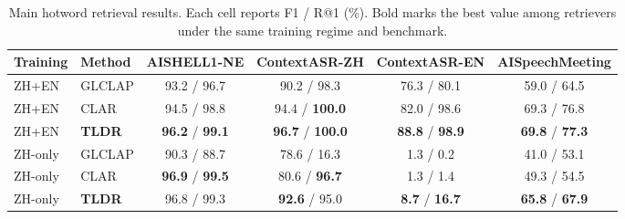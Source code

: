 \begin{table}[t]
\centering
\caption{Main hotword retrieval results. Each cell reports F1 / R@1 (\%). Bold marks the best value among retrievers under the same training regime and benchmark.}
\label{tab:retrieval_main}
\small
\begin{tabular}{llcccc}
\toprule
Training & Method & AISHELL1-NE & ContextASR-ZH & ContextASR-EN & AISpeechMeeting \\
\midrule
ZH+EN & GLCLAP & 93.2 / 96.7 & 90.2 / 98.3 & 76.3 / 80.1 & 59.0 / 64.5 \\
ZH+EN & CLAR & 94.5 / 98.8 & 94.4 / \textbf{100.0} & 82.0 / 98.6 & 69.3 / 76.8 \\
ZH+EN & \textbf{TLDR} & \textbf{96.2} / \textbf{99.1} & \textbf{96.7} / \textbf{100.0} & \textbf{88.8} / \textbf{98.9} & \textbf{69.8} / \textbf{77.3} \\
\midrule
ZH-only & GLCLAP & 90.3 / 88.7 & 78.6 / 16.3 & 1.3 / 0.2 & 41.0 / 53.1 \\
ZH-only & CLAR & \textbf{96.9} / \textbf{99.5} & 80.6 / \textbf{96.7} & 1.3 / 1.4 & 49.3 / 54.5 \\
ZH-only & \textbf{TLDR} & 96.8 / 99.3 & \textbf{92.6} / 95.0 & \textbf{8.7} / \textbf{16.7} & \textbf{65.8} / \textbf{67.9} \\
\bottomrule
\end{tabular}
\end{table}
